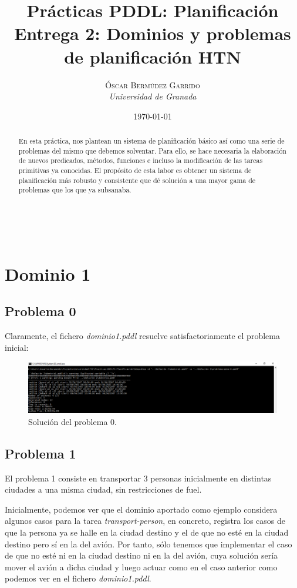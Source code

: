 \documentclass[a4paper, 11pt]{article}
\title{\textbf{Prácticas PDDL: Planificación}\\ %
Entrega 2: Dominios y problemas de planificación HTN} %
\author{\textsc{Óscar Bermúdez Garrido} %
\\{\textit{Universidad de Granada}}} %
\date{\today} %
\makeatletter
\renewcommand{\maketitle}{
  \begin{flushright} %
  
  {\LARGE\@title} %
  
  \vspace{50pt} %
  
  {\large\@author} %
  \\\@date %
  \vspace{40pt} %
  \end{flushright}
}
\makeatother
\begin{document}
\maketitle %

\renewcommand{\abstractname}{Resumen} %
\begin{abstract}
	En esta práctica, nos plantean un sistema de planificación básico así como una serie de problemas
	del mismo que debemos solventar. Para ello, se hace necesaria la elaboración de nuevos predicados,
	métodos, funciones e incluso la modificación de las tareas primitivas ya conocidas. El propósito
	de esta labor es obtener un sistema de planificación más robusto y consistente que dé solución a
	una mayor gama de problemas que los que ya subsanaba.
\end{abstract}

{\parskip=2pt
  \tableofcontents
}
\pagebreak


\section{Dominio 1}
	\subsection{Problema 0}
		Claramente, el fichero \textit{dominio1.pddl} resuelve satisfactoriamente el problema inicial:
		\begin{figure}[H]
			\centering
			\includegraphics[width=15cm]{Ej1-problema0.png}
			\caption{Solución del problema 0.}
			\label{Prob-0}
		\end{figure}
		
	
	\subsection{Problema 1}
		El problema 1 consiste en transportar 3 personas inicialmente en distintas ciudades a una misma ciudad,
		sin restricciones de fuel.
		
		Inicialmente, podemos ver que el dominio aportado como ejemplo considera algunos casos para la tarea
		\textit{transport-person}, en concreto, registra los casos de que la persona ya se halle en la ciudad
		destino y el de que no esté en la ciudad destino pero sí en la del avión. Por tanto, sólo tenemos
		que implementar el caso de que no esté ni en la ciudad destino ni en la del avión, cuya solución sería
		mover el avión a dicha ciudad y luego actuar como en el caso anterior como podemos ver en el fichero
		\textit{dominio1.pddl}.
		
\end{document}
